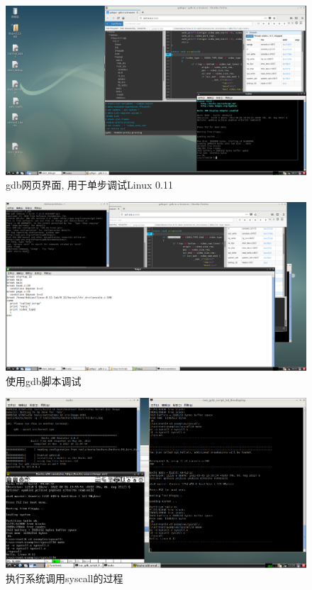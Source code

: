 \documentclass{ctexart}
\begin{document}
\begin{figure}[htbp]
	\centering
	\includegraphics[width=0.9\linewidth]{img/2.png}
	\caption[]{gdb网页界面, 用于单步调试Linux 0.11}
\end{figure}
\newpage
\begin{figure}[htbp]
	\centering
	\includegraphics[width=0.9\linewidth]{img/3.png}
	\caption[]{使用gdb脚本调试}
\end{figure}

\begin{figure}[htbp]
	\centering
	\includegraphics[width=0.9\linewidth]{img/4.png}
	\caption[]{执行系统调用syscall的过程}
\end{figure}
\end{document}
